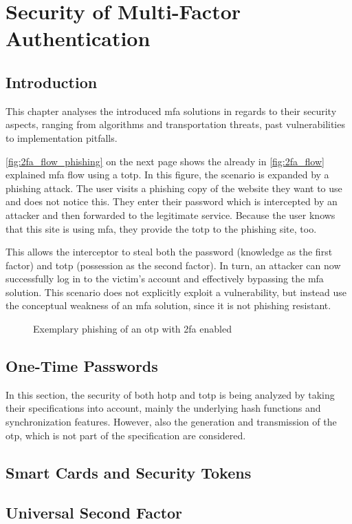 \chapter{Security of Multi-Factor Authentication}

\section{Introduction}

This chapter analyses the introduced \gls{mfa} solutions in regards to their security aspects, ranging from algorithms and transportation threats, past vulnerabilities to implementation pitfalls.

\autoref{fig:2fa_flow_phishing} on the next page shows the already in \autoref{fig:2fa_flow} explained \gls{mfa} flow using a \gls{totp}. In this figure, the scenario is expanded by a phishing attack. The user visits a phishing copy of the website they want to use and does not notice this. They enter their password which is intercepted by an attacker and then forwarded to the legitimate service. Because the user knows that this site is using \gls{mfa}, they provide the \gls{totp} to the phishing site, too.

This allows the interceptor to steal both the password (knowledge as the first factor) and \gls{totp} (possession as the second factor). In turn, an attacker can now successfully log in to the victim's account and effectively bypassing the \gls{mfa} solution. This scenario does not explicitly exploit a vulnerability, but instead use the conceptual weakness of an \gls{mfa} solution, since it is not phishing resistant.

\newpage

\begin{figure}[hbt]
	\centering
	
	\caption[Exemplary phishing of an \gls{otp} with \gls{2fa} enabled]{Exemplary phishing of an \gls{otp} with \gls{2fa} enabled\footnotemark}
	\label{fig:2fa_flow_phishing}
\end{figure}

\section{One-Time Passwords}
\label{sec:totp_sec}

In this section, the security of both \gls{hotp} and \gls{totp} is being analyzed by taking their specifications into account, mainly the underlying hash functions and synchronization features. However, also the generation and transmission of the \gls{otp}, which is not part of the specification are considered.



\section{Smart Cards and Security Tokens}
\label{sec:tokens}



\section{Universal Second Factor}
\label{sec:u2f}


